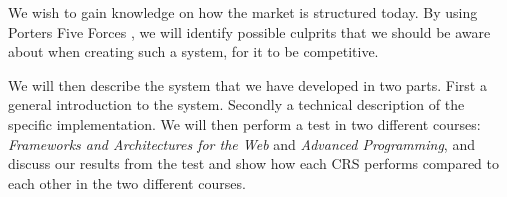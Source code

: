 We wish to gain knowledge on how the market is structured today. By using Porters Five Forces \cite{porter2008five}, we will identify possible culprits that we should be aware about when creating such a system, for it to be competitive.

We will then describe the system that we have developed in two parts. First a general introduction to the system. Secondly a technical description of the specific implementation.
We will then perform a test in two different courses: \emph{Frameworks and Architectures for the Web} and \emph{Advanced Programming}, and discuss our results from the test and show how each CRS performs compared to each other in the two different courses.







